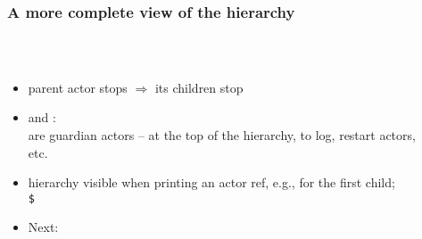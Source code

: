 \documentclass[aspectratio=169]{beamer}
\begin{document}
\begin{frame}[fragile]\frametitle{A more complete view of the hierarchy}
~\\[-6mm]
\begin{columns}
\begin{column}{0.57\textwidth}
\begin{itemize}
  \item \alert{parent} actor stops $\Rightarrow$ its \alert{children} stop
  \item {} and :
    \\ are \alert{guardian actors} -- at the top of the hierarchy, to log, restart actors, etc.
  \item hierarchy visible when printing an actor ref, e.g., for the first child;
    \\\texttt{\$}
  \item \pause \alert{Next:}
\end{itemize}
\end{column}
\begin{column}{0.41\textwidth}
  ~\\
\end{column}
\end{columns}
\end{frame}
\end{document}
